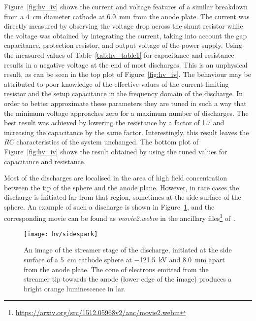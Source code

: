 Figure~\ref{fig:hv_iv} shows the current and voltage features of a similar breakdown from a \SI{4}{\centi\metre} diameter cathode at \SI{6.0}{\milli\metre} from the anode plate.
The current was directly measured by observing the voltage drop across the shunt resistor while the voltage was obtained by integrating the current, taking into account the gap capacitance, protection resistor, and output voltage of the power supply.
Using the measured values of Table~\ref{tab:hv_table1} for capacitance and resistance results in a negative voltage at the end of most discharges.
This is an unphysical result, as can be seen in the top plot of Figure~\ref{fig:hv_iv}.
The behaviour may be attributed to poor knowledge of the effective values of the current-limiting resistor and the setup capacitance in the frequency domain of the discharge.
In order to better approximate these parameters they are tuned in such a way that the minimum voltage approaches zero for a maximum number of discharges.
The best result was achieved by lowering the resistance by a factor of \num{1.7} and increasing the capacitance by the same factor.
Interestingly, this result leaves the $RC$ characteristics of the system unchanged.
The bottom plot of Figure~\ref{fig:hv_iv} shows the result obtained by using the tuned values for capacitance and resistance.

Most of the discharges are localised in the area of high field concentration between the tip of the sphere and the anode plane.
However, in rare cases the discharge is initiated far from that region, sometimes at the side surface of the sphere.
An example of such a discharge is shown in Figure~\ref{fig:hv_side}, and the corresponding movie can be found as \emph{movie2.webm} in the ancillary files\footnote{\url{https://arxiv.org/src/1512.05968v2/anc/movie2.webm}} of~\cite{breakdown_16}.

\begin{figure}[tbp]
	\centering	
	\texttt{[image: hv/sidespark]}
	\caption[ test streamer image]{%
		An image of the streamer stage of the discharge, initiated at the side surface of a \SI{5}{\centi\metre} cathode sphere at \SI{-121.5}{\kilo\volt} and \SI{8.0}{\milli\metre} apart from the anode plate.
		The cone of electrons emitted from the streamer tip towards the anode (lower edge of the image) produces a bright orange luminescence in \acrshort{lar}.
	}
	\label{fig:hv_side}
\end{figure}

